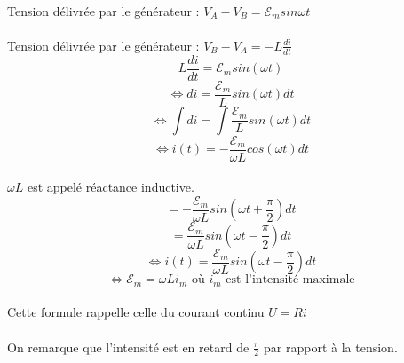 \documentclass[a4paper]{article}
\begin{document}
\paragraph{} Tension délivrée par le générateur : $V_A-V_B=\mathscr{E}_msin{\omega t}$
\paragraph{} Tension délivrée par le générateur : $V_B-V_A=-L\frac{di}{dt}$
\[L\frac{di}{dt}=\mathscr{E}_msin(\omega t)\]
\[\Leftrightarrow di=\frac{\mathscr{E}_m}{L}sin(\omega t)dt\]
\[\Leftrightarrow \int di=\int \frac{\mathscr{E}_m}{L}sin(\omega t)dt\]
\[\Leftrightarrow i(t)=-\frac{\mathscr{E}_m}{\omega L}cos(\omega t)dt\]
\paragraph {} $\omega L$ est appelé réactance inductive.
\[=-\frac{\mathscr{E}_m}{\omega L}sin\left(\omega t+ \frac{\pi}{2}\right)dt\]
\[=\frac{\mathscr{E}_m}{\omega L}sin\left(\omega t- \frac{\pi}{2}\right)dt\]
\[\Leftrightarrow i(t)=\frac{\mathscr{E}_m}{\omega L}sin\left(\omega t- \frac{\pi}{2}\right)dt\]
\[\Leftrightarrow \mathscr{E}_m=\omega Li_m \text{ où $i_m$ est l'intensité maximale}\]
\paragraph{}Cette formule rappelle celle du courant continu $U=Ri$
\paragraph{}On remarque que l'intensité est en retard de $\frac{\pi}{2}$ par rapport à la tension.
\end{document}
